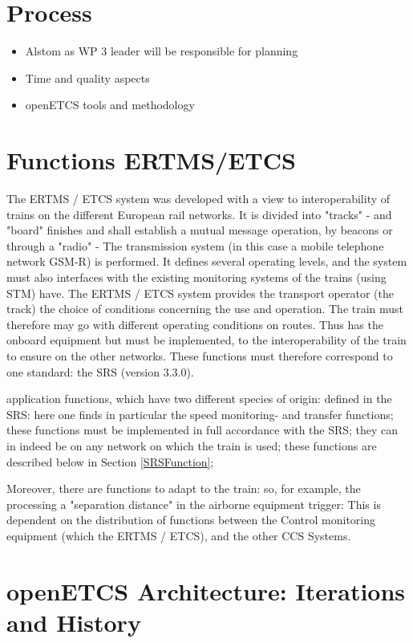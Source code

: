 \documentclass{template/openetcs_report}
\begin{document}
\section{Process}
\begin{itemize}
\item Alstom as WP 3 leader will be responsible for planning
\item Time and quality aspects
\item openETCS tools and methodology
\end{itemize}


\section{Functions ERTMS/ETCS}


The ERTMS / ETCS system was developed with a view to interoperability of trains on the 
different European rail networks. It is divided into "tracks" - and "board" finishes 
and shall establish a mutual message operation, by beacons or through a "radio" - 
The transmission system (in this case a mobile telephone network GSM-R) is performed. 
It defines several operating levels, and the system must also interfaces with the 
existing monitoring systems of the trains (using STM) have. 
The ERTMS / ETCS system provides the transport operator (the track) the choice of conditions 
concerning the use and operation. 
The train must therefore may go with different operating conditions on routes. 
Thus has the onboard equipment but must be implemented, 
to the interoperability of the train to ensure on the other networks. 
These functions must therefore correspond to one standard: the SRS (version 3.3.0). 

application functions, which have two different species of origin: 
defined in the SRS: here one finds in particular the 
speed monitoring- and transfer functions; these functions 
must be implemented in full accordance with the SRS; they can in 
indeed be on any network on which the train is used; these functions 
are described below in Section \ref{SRSFunction}; 


Moreover, there are functions to adapt to the train: so, for example, the processing 
a "separation distance" in the airborne equipment trigger: 
This is dependent on the distribution of functions between the 
Control monitoring equipment (which the ERTMS / ETCS), and the other 
CCS Systems.

\section{openETCS Architecture: Iterations and History}
\end{document}
